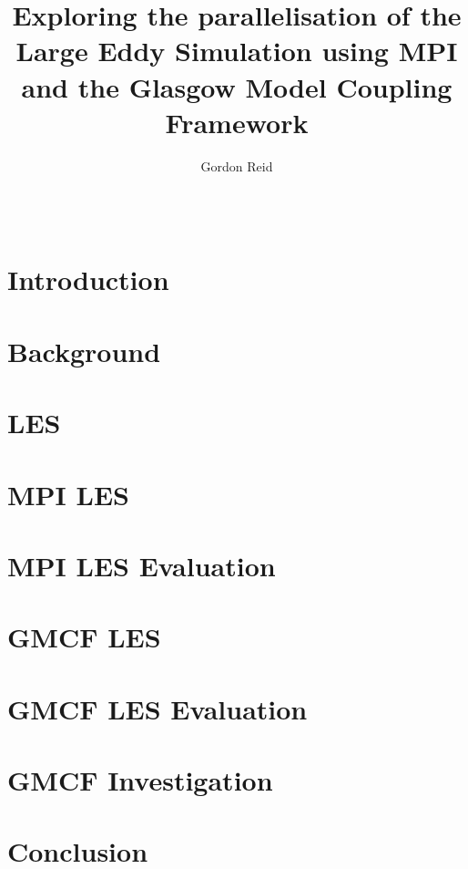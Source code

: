 \documentclass{acm_proc_article-sp}
\title{Exploring the parallelisation of the Large Eddy Simulation using MPI and
the Glasgow Model Coupling Framework}
\author{
    \alignauthor
    Gordon Reid\\
    \affaddr{School of Computing Science}\\
    \affaddr{University of Glasgow}\\
    \email{1002536r@student.gla.ac.uk}
}
\begin{document}
\maketitle

\begin{abstract}

\end{abstract}

\section{Introduction}


\section{Background}
\label{sec:Background}


\section{LES}
\label{sec:LES}


\section{MPI LES}
\label{sec:MPILES}


\section{MPI LES Evaluation}
\label{sec:MPILESEval}


\section{GMCF LES}
\label{sec:GMCFLES}


\section{GMCF LES Evaluation}
\label{sec:GMCFLESEval}


\section{GMCF Investigation}
\label{sec:GMCFInvestigation}


\section{Conclusion}
\label{sec:Conclusion}




\end{document}
